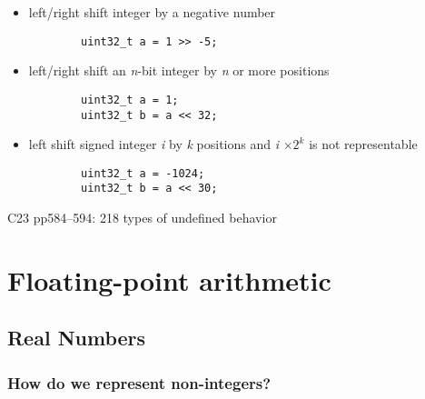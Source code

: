 \documentclass[12pt]{article}
\begin{document}
\begin{itemize}
    \item left/right shift integer by a negative number
    \begin{lstlisting}
        uint32_t a = 1 >> -5;
    \end{lstlisting}

    \item left/right shift an \textit{n}-bit integer by \textit{n} or more positions
    \begin{lstlisting}
        uint32_t a = 1;
        uint32_t b = a << 32;
    \end{lstlisting}

    \item left shift signed integer \textit{i} by \textit{k} positions and \textit{i} $ \times 2^{k} $ is not representable
    \begin{lstlisting}
        uint32_t a = -1024;
        uint32_t b = a << 30;
    \end{lstlisting}
\end{itemize}
C23 pp584--594: 218 types of undefined behavior






















\newpage
\section{Floating-point arithmetic}

\subsection{Real Numbers}

\subsubsection{How do we represent non-integers?}
\end{document}
